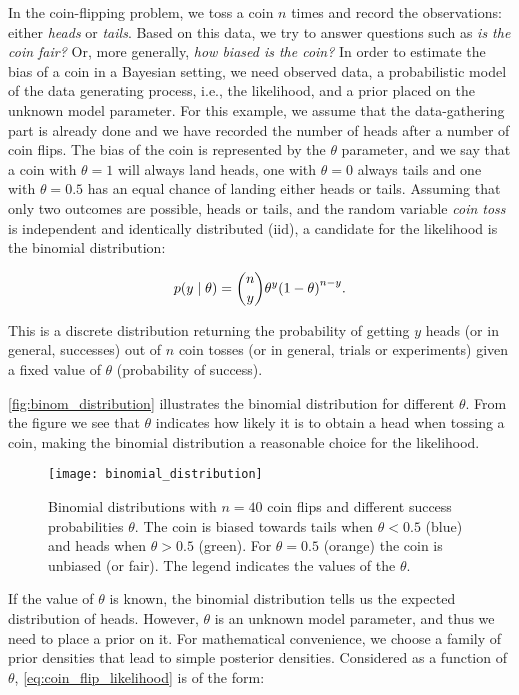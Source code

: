 In the coin-flipping problem, we toss a coin $n$ times and record the observations: either \textit{heads} or \textit{tails}. Based on this data, we try to answer questions such as \textit{is the coin fair?} Or, more generally, \textit{how biased is the coin?} In order to estimate the bias of a coin in a Bayesian setting, we need observed data, a probabilistic model of the data generating process, i.e., the likelihood, and a prior placed on the unknown model parameter. For this example, we assume that the data-gathering part is already done and we have recorded the number of heads after a number of coin flips. The bias of the coin is represented by the $\theta$ parameter, and we say that a coin with $\theta=1$ will always land heads, one with $\theta=0$ always tails and one with $\theta=0.5$ has an equal chance of landing either heads or tails. Assuming that only two outcomes are possible, heads or tails, and the random variable \textit{coin toss} is independent and identically distributed (iid), a candidate for the likelihood is the binomial distribution: 

\begin{equation}\label{eq:coin_flip_likelihood}
    p \qty(y \mid \theta) = \binom{n}{y} \theta^y \qty(1 - \theta)^{n-y}.
\end{equation}

This is a discrete distribution returning the probability of getting $y$ heads (or in general, successes) out of $n$ coin tosses (or in general, trials or experiments) given a fixed value of $\theta$ (probability of success). 

\autoref{fig:binom_distribution} illustrates the binomial distribution for different $\theta$. From the figure we see that $\theta$ indicates how likely it is to obtain a head when tossing a coin, making the binomial distribution a reasonable choice for the likelihood. 

\begin{figure}[ht]
    \centering
    \texttt{[image: binomial\_distribution]}
    \caption{Binomial distributions with $n=40$ coin flips and different success probabilities $\theta$. The coin is biased towards tails when $\theta < 0.5$ (blue) and heads when $\theta > 0.5$ (green). For $\theta=0.5$ (orange) the coin is unbiased (or fair). The legend indicates the values of the $\theta$.}
    \label{fig:binom_distribution}
\end{figure} 

If the value of $\theta$ is known, the binomial distribution tells us the expected distribution of heads. However, $\theta$ is an unknown model parameter, and thus we need to place a prior on it. For mathematical convenience, we choose a family of prior densities that lead to simple posterior densities. Considered as a function of $\theta$, \autoref{eq:coin_flip_likelihood} is of the form: 

